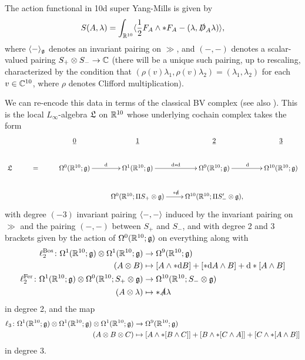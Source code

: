 \documentclass[10pt, oneside]{article}
\begin{document}
The action functional in 10d super Yang-Mills is given by
\[S(A,\lambda) = \int_{\mathbb R^{10}} \langle \frac{1}{2} F_A \wedge \ast F_A - (\lambda, \slashed{D}_A \lambda)\rangle,\]
where $\langle - \rangle_\mathfrak g$ denotes an invariant pairing on $\gg$, and $(-,-)$ denotes a scalar-valued pairing $S_+ \otimes S_- \to \mathbb C$ (there will be a unique such pairing, up to rescaling, characterized by the condition that $(\rho(v)\lambda_1,\rho(v)\lambda_2) = (\lambda_1,\lambda_2)$ for each $v \in \mathbb C^{10}$, where $\rho$ denotes Clifford multiplication). 

We can re-encode this data in terms of the classical BV complex (see also \cite[Section 3.1]{ElliottYoo1}).  
This is the local $L_\infty$-algebra $\mathfrak L$ on $\mathbb R^{10}$ whose underlying cochain complex takes the form
\[
\xymatrix{
& & \ul{0} & \ul{1} & \ul{2} & \ul{3} \\
\fL & = & \Omega^0(\RR^{10}; \gg) \ar[r]^{\d} &\Omega^1(\RR^{10}; \gg) \ar[r]^{\d \ast \d} &\Omega^9(\RR^{10}; \gg) \ar[r]^{\d} &\Omega^{10}(\RR^{10}; \gg) \\
& & &\Omega^0(\RR^{10}; \Pi S_+ \otimes \gg) \ar[r]^{\ast \sd \d} &\Omega^{10}(\RR^{10}; \Pi S'_- \otimes \gg), &
}\]
with degree $(-3)$ invariant pairing $\langle-,-\rangle$ induced by the invariant pairing on $\gg$ and the pairing $(-,-)$ between $S_+$ and $S_-$, and with degree 2 and 3 brackets given by the action of $\Omega^0(\mathbb R^{10}; \mathfrak{g})$ on everything along with
\begin{align*}
\ell_2^{\mathrm{Bos}} \colon \Omega^1(\mathbb R^{10};\mathfrak{g}) \otimes \Omega^1(\mathbb R^{10};\mathfrak{g}) &\to \Omega^{9}(\mathbb R^{10};\mathfrak{g}) \\
(A \otimes B) &\mapsto [A \wedge \ast \mathrm{d} B] + [\ast \mathrm{d}  A \wedge B] + \mathrm{d} \ast[A \wedge B] \\
\ell_2^{\mathrm{Fer}} \colon \Omega^1(\mathbb R^{10};\mathfrak{g}) \otimes \Omega^0(\mathbb R^{10}; S_{+} \otimes \mathfrak{g}) &\to \Omega^{10}(\mathbb R^{10}; S_{-} \otimes \mathfrak{g}) \\
(A \otimes \lambda) &\mapsto \ast \slashed{A} \lambda
\end{align*}
in degree 2, and the map
\begin{align*}
\ell_3 \colon \Omega^1(\mathbb R^{10};\mathfrak{g}) \otimes \Omega^1(\mathbb R^{10};\mathfrak{g}) \otimes \Omega^1(\mathbb R^{10};\mathfrak{g}) &\to \Omega^{9}(\mathbb R^{10};\mathfrak{g}) \\
(A \otimes B \otimes C) &\mapsto [A \wedge \ast[B \wedge C]] + [B \wedge \ast[C \wedge A]] + [C \wedge \ast[A \wedge B]]
\end{align*}
in degree 3.
\end{document}
